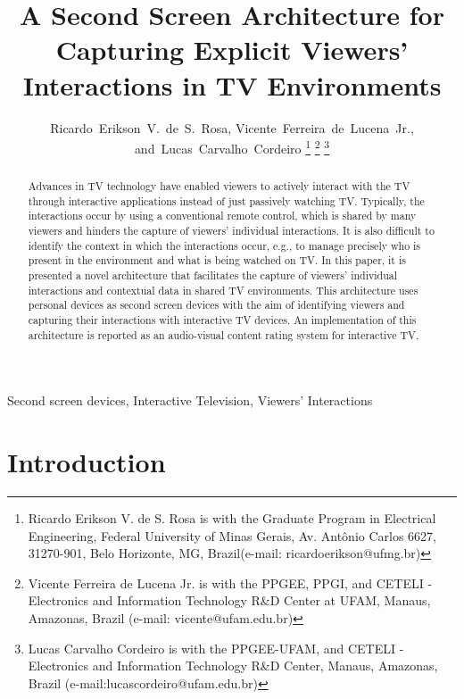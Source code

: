 \documentclass[journal]{IEEEtran}
\begin{document}
\title{A Second Screen Architecture for Capturing Explicit Viewers' Interactions in TV Environments}
\author{Ricardo~Erikson~V.~de~S.~Rosa, 
	Vicente~Ferreira~de~Lucena~Jr.,
	and~Lucas~Carvalho~Cordeiro
\thanks{Ricardo Erikson V. de S. Rosa is with the Graduate Program in Electrical Engineering, Federal University of Minas Gerais, Av. Antônio Carlos 6627, 31270-901, Belo Horizonte, MG, Brazil(e-mail: ricardoerikson@ufmg.br)}%
\thanks{Vicente Ferreira de Lucena Jr. is with the PPGEE, PPGI, and CETELI - Electronics and Information Technology R\&D Center at UFAM, Manaus, Amazonas, Brazil (e-mail: vicente@ufam.edu.br)}%
\thanks{Lucas Carvalho Cordeiro is with the PPGEE-UFAM, and CETELI - Electronics and Information Technology R\&D Center, Manaus, Amazonas, Brazil (e-mail:lucascordeiro@ufam.edu.br)}}

\maketitle

\begin{abstract}
Advances in TV technology have enabled viewers to actively interact with the TV through interactive applications instead of just passively watching TV. Typically, the interactions occur by using a conventional remote control, which is shared by many viewers and hinders the capture of viewers' individual interactions. It is also difficult to identify the context in which the interactions occur, e.g., to manage precisely who is present in the environment and what is being watched on TV. In this paper, it is presented a novel architecture that facilitates the capture of viewers' individual interactions and contextual data in shared TV environments. This architecture uses personal devices as second screen devices with the aim of identifying viewers and capturing their interactions with interactive TV devices. An implementation of this architecture is reported as an audio-visual content rating system for interactive TV.
\end{abstract}

\begin{IEEEkeywords}
Second screen devices, Interactive Television, Viewers' Interactions
\end{IEEEkeywords}

\IEEEpeerreviewmaketitle

\section{Introduction}
\end{document}
